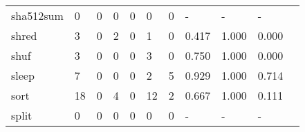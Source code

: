 \begin{longtable}{lp{1.20cm}p{1.20cm}p{1.20cm}p{1.20cm}p{1.20cm}p{1.20cm}p{1.20cm}p{1.20cm}p{1.20cm}p{1.20cm}}
sha512sum &                                     0 &                                                  0 &                                                  0 &                                                  0 &                                                  0 &                                                  0 &                                             - &                                                  - &                                                  - \\
shred     &                                     3 &                                                  0 &                                                  2 &                                                  0 &                                                  1 &                                                  0 &                                         0.417 &                                              1.000 &                                              0.000 \\
shuf      &                                     3 &                                                  0 &                                                  0 &                                                  0 &                                                  3 &                                                  0 &                                         0.750 &                                              1.000 &                                              0.000 \\
sleep     &                                     7 &                                                  0 &                                                  0 &                                                  0 &                                                  2 &                                                  5 &                                         0.929 &                                              1.000 &                                              0.714 \\
sort      &                                    18 &                                                  0 &                                                  4 &                                                  0 &                                                 12 &                                                  2 &                                         0.667 &                                              1.000 &                                              0.111 \\
split     &                                     0 &                                                  0 &                                                  0 &                                                  0 &                                                  0 &                                                  0 &                                             - &                                                  - &                                                  - \\

\end{longtable}
